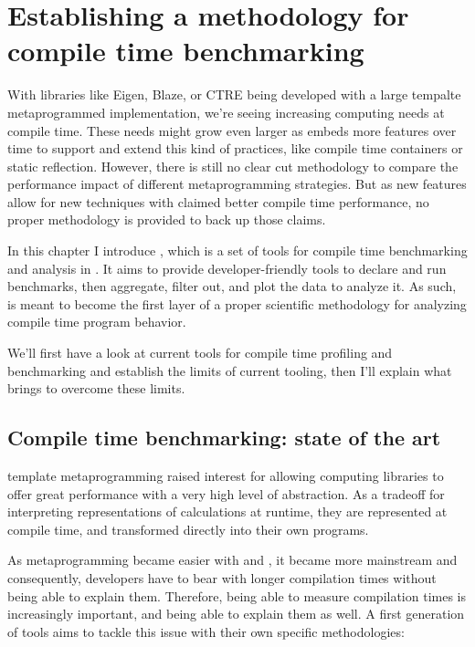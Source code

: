 \documentclass[../../main.tex]{subfiles}
\begin{document}
\chapter{Establishing a methodology for compile time benchmarking}

With libraries like Eigen\cite{eigen}, Blaze\cite{blazelib}, or CTRE\cite{ctre}
being developed with a large tempalte metaprogrammed implementation, we're seeing
increasing computing needs at compile time. These needs might grow even larger
as \cpp embeds more features over time to support and extend this kind of
practices, like compile time containers\cite{more-constexpr-containers} or static
reflection\cite{static-reflection}. However, there is still no clear cut methodology
to compare the performance impact of different metaprogramming strategies. But
as new \cpp features allow for new techniques with claimed better compile time
performance, no proper methodology is provided to back up those claims.

In this chapter I introduce \ctbench, which is a set of tools for compile time
benchmarking and analysis in \cpp. It aims to provide developer-friendly tools
to declare and run benchmarks, then aggregate, filter out, and plot the data to
analyze it. As such, \ctbench is meant to become the first layer of a proper
scientific methodology for analyzing compile time program behavior.

We'll first have a look at current tools for compile time profiling and
benchmarking and establish the limits of current tooling, then I'll explain
what \ctbench brings to overcome these limits.

\section{Compile time benchmarking: state of the art}

\cpp template metaprogramming raised interest for allowing computing libraries to
offer great performance with a very high level of abstraction. As a tradeoff for
interpreting representations of calculations at runtime, they are represented at
compile time, and transformed directly into their own programs.

As metaprogramming became easier with  and , it became more mainstream
and consequently, developers have to bear with longer compilation times without
being able to explain them. Therefore, being able to measure compilation times
is increasingly important, and being able to explain them as well. A first
generation of tools aims to tackle this issue with their own specific
methodologies:
\end{document}
